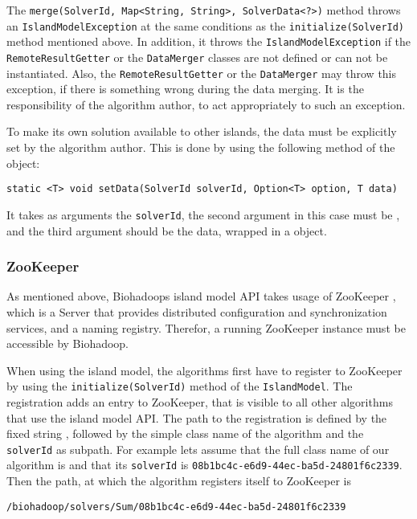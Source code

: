 \begin{itemize}
      The \texttt{merge(SolverId, Map<String, String>, SolverData<?>)} method throws an \texttt{IslandModelException} at the same conditions as the \texttt{initialize(SolverId)} method mentioned above. In addition, it throws the \texttt{IslandModelException} if the \texttt{RemoteResultGetter} or the \texttt{DataMerger} classes are not defined or can not be instantiated. Also, the \texttt{RemoteResultGetter} or the \texttt{DataMerger} may throw this exception, if there is something wrong during the data merging. It is the responsibility of the algorithm author, to act appropriately to such an exception.
    \end{itemize}
    
    To make its own solution available to other islands, the data must be explicitly set by the algorithm author. This is done by using the following method of the  object:
    \begin{lstlisting}
static <T> void setData(SolverId solverId, Option<T> option, T data)
    \end{lstlisting}   
    
    It takes as arguments the \texttt{solverId}, the second argument in this case must be , and the third argument should be the data, wrapped in a  object.

    \subsubsection{ZooKeeper}
    \label{chap:impl:island-model-zookeeper}
    As mentioned above, Biohadoops island model API takes usage of ZooKeeper \cite{zookeeper}, which is a Server that provides distributed configuration and synchronization services, and a naming registry. Therefor, a running ZooKeeper instance must be accessible by Biohadoop.
    
    When using the island model, the algorithms first have to register to ZooKeeper by using the \texttt{initialize(SolverId)} method of the \texttt{IslandModel}. The registration adds an entry to ZooKeeper, that is visible to all other algorithms that use the island model API. The path to the registration is defined by the fixed string , followed by the simple class name of the algorithm and the \texttt{solverId} as subpath. For example lets assume that the full class name of our algorithm is  and that its \texttt{solverId} is \texttt{08b1bc4c-e6d9-44ec-ba5d-24801f6c2339}. Then the path, at which the algorithm registers itself to ZooKeeper is
    \begin{lstlisting}
/biohadoop/solvers/Sum/08b1bc4c-e6d9-44ec-ba5d-24801f6c2339
    \end{lstlisting}
    
